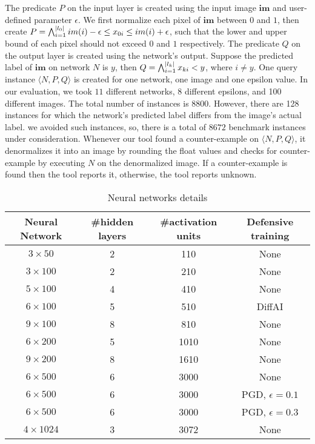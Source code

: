 The predicate $P$ on the input layer is created using the input image $\boldsymbol{im}$ and user-defined parameter $\epsilon$.  We first normalize each pixel of $\boldsymbol{im}$ between $0$ and $1$, then create  $P = \bigwedge_{i=1}^{|l_0|} im(i)-\epsilon \leq x_{0i}\leq im(i)+\epsilon$, such that the lower and upper bound of each pixel should not exceed $0$ and $1$ respectively. The predicate $Q$ on the output layer is created using the network's output.     Suppose the predicted label of $\boldsymbol{im}$ on network $N$ is $y$, then $Q = \bigwedge_{i=1}^{|l_k|} x_{ki} < y$, where $i \neq y$.  One query instance $\langle N,P,Q \rangle$ is created for one network, one image and one epsilon value.  In our evaluation, we took $11$ different networks, 8 different epsilons, and 100 different images. The 
total number of instances is $8800$. However, there are 128 instances for which the network's predicted label differs from the image's actual label. we avoided such instances, so, there is a total of $8672$ benchmark instances
under consideration.    Whenever our tool found a counter-example on $\langle N,P,Q \rangle$, it denormalizes it into an image by rounding the float values 
and checks for counter-example by executing $N$ on the denormalized image.
If a counter-example is found then the tool reports it, otherwise, the tool reports unknown.



\begin{table}[t]
    \centering
    \begin{tabular}{c|c|c|c}
        \hline
        \textbf{Neural Network} & \textbf{\#hidden layers} & \textbf{\#activation units} & \textbf{Defensive training} \\
        \hline
        $3\times 50$ & 2 & 110 & None \\
        $3\times 100$ & 2 & 210 & None  \\
        $5\times 100$ & 4 & 410 & None  \\
        $6\times 100$ & 5 & 510 & DiffAI \\
        $9\times 100$ & 8 & 810 & None  \\
        $6\times 200$ & 5 & 1010 & None  \\
        $9\times 200$ & 8 & 1610 & None  \\
        $6\times 500$ & 6 & 3000 & None  \\
        $6\times 500$ & 6 & 3000 & PGD, $\epsilon = 0.1$ \\
        $6\times 500$ & 6 & 3000 & PGD, $\epsilon = 0.3$ \\
        $4\times 1024$ & 3 & 3072 & None  \\
        \hline
    \end{tabular}
    \caption{Neural networks details}
    \label{tb:nndetail}
\end{table}

